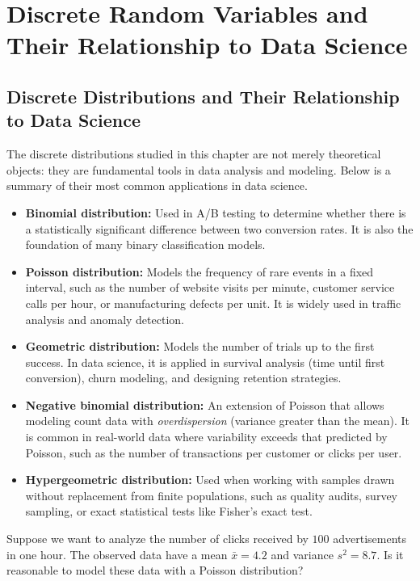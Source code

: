 \section{Discrete Random Variables and Their Relationship to Data Science}
\subsection{Discrete Distributions and Their Relationship to Data Science}

The discrete distributions studied in this chapter are not merely theoretical objects: they are fundamental tools in data analysis and modeling. Below is a summary of their most common applications in data science.

\begin{itemize}
 \item \textbf{Binomial distribution:} Used in A/B testing to determine whether there is a statistically significant difference between two conversion rates. It is also the foundation of many binary classification models.

 \item \textbf{Poisson distribution:} Models the frequency of rare events in a fixed interval, such as the number of website visits per minute, customer service calls per hour, or manufacturing defects per unit. It is widely used in traffic analysis and anomaly detection.

 \item \textbf{Geometric distribution:} Models the number of trials up to the first success. In data science, it is applied in survival analysis (time until first conversion), churn modeling, and designing retention strategies.

 \item \textbf{Negative binomial distribution:} An extension of Poisson that allows modeling count data with \emph{overdispersion} (variance greater than the mean). It is common in real-world data where variability exceeds that predicted by Poisson, such as the number of transactions per customer or clicks per user.

 \item \textbf{Hypergeometric distribution:} Used when working with samples drawn without replacement from finite populations, such as quality audits, survey sampling, or exact statistical tests like Fisher's exact test.
\end{itemize}

\begin{ejemplo}
 \label{exmp:2.10.18}
 Suppose we want to analyze the number of clicks received by $100$ advertisements in one hour. The observed data have a mean $\bar{x}=4.2$ and variance $s^{2}=8.7$. Is it reasonable to model these data with a Poisson distribution?
\end{ejemplo}

